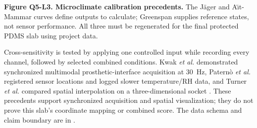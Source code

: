 \vfill
{\fontsize{6.7}{7.7}\selectfont\color{AUBGray}
\textbf{Figure Q5-L3. Microclimate calibration precedents.} The J\"ager and
A\"{\i}t-Mammar curves define outputs to calculate; Greenspan supplies
reference states, not sensor performance. All three must be regenerated for
the final protected PDMS slab using project data.\par}

\clearpage
\hypertarget{q5-integration-mapping}{}


{\fontsize{8.95}{10.55}\selectfont
Cross-sensitivity is tested by applying one controlled input while recording
every channel, followed by selected combined conditions. Kwak \textit{et al.}
demonstrated synchronized multimodal prosthetic-interface acquisition at
30~Hz, Patern\`o \textit{et al.} registered sensor locations and logged slower
temperature/RH data, and Turner \textit{et al.} compared spatial interpolation
on a three-dimensional socket \cite{q3kwak2020,paterno2020,q3turner2021}.
These precedents support synchronized acquisition and spatial visualization;
they do not prove this slab's coordinate mapping or combined score. The data
schema and claim boundary are in .\par}

